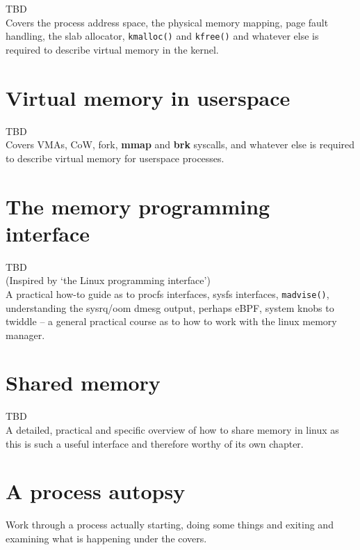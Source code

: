 \documentclass[a4paper,oneside]{scrbook}
\begin{document}
TBD\\

Covers the process address space, the physical memory mapping, page fault
handling, the slab allocator, \texttt{kmalloc()} and
\texttt{kfree()} and whatever else is required to describe virtual memory
in the kernel.\\

\chapter{Virtual memory in userspace}

TBD\\

Covers VMAs, CoW, fork, \textbf{mmap} and \textbf{brk} syscalls, and whatever
else is required to describe virtual memory for userspace processes.\\

\chapter{The memory programming interface}

TBD\\

(Inspired by `the Linux programming interface')\\

A practical how-to guide as to procfs interfaces, sysfs interfaces,
\texttt{madvise()}, understanding the sysrq/oom dmesg output, perhaps
eBPF, system knobs to twiddle -- a general practical course as to how to work
with the linux memory manager.\\

\chapter{Shared memory}

TBD\\

A detailed, practical and specific overview of how to share memory in linux as
this is such a useful interface and therefore worthy of its own chapter.\\

\chapter{A process autopsy}

Work through a process actually starting, doing some things and exiting and
examining what is happening under the covers.\\
\end{document}

